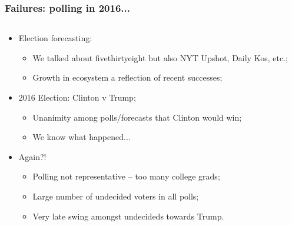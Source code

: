 \documentclass[aspectratio=169]{beamer}
\theoremstyle{principle}
\begin{document}
\begin{frame}
\frametitle{Failures: polling in 2016...}

\begin{columns}
\begin{column}{0.5\textwidth}


\begin{itemize}
\item Election forecasting:
\begin{itemize}
\item We talked about fivethirtyeight but also NYT Upshot, Daily Kos, etc.;
\item Growth in ecosystem a reflection of recent successes;
\end{itemize}

\item 2016 Election: Clinton v Trump;
\begin{itemize}
\item Unanimity among polls/forecasts that Clinton would win;
\item We know what happened...
\end{itemize}

\item Again?!
\begin{itemize}
\item[]\color{white} Polling not representative -- too many college grads;
\item[]\color{white} Large number of undecided voters in all polls;
\item[]\color{white} Very late swing amongst undecideds towards Trump.
\end{itemize}
\end{itemize}


\end{column}
\end{columns}
\end{frame}
\end{document}
